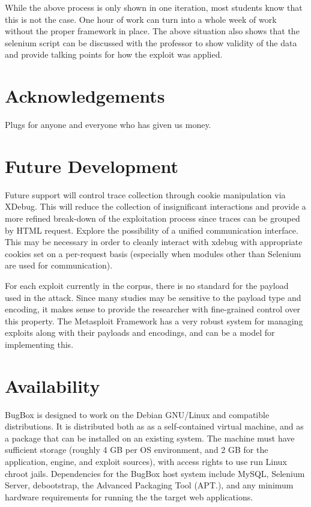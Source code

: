 \documentclass[letterpaper,twocolumn,10pt]{article}
\begin{document}
While the above process is only shown in one iteration, most students know that this is not the case.  One hour of work can turn into a whole week of work without the proper framework in place.  The above situation also shows that the selenium script can be discussed with the professor to show validity of the data and provide talking points for how the exploit was applied.


\section{Acknowledgements}

Plugs for anyone and everyone who has given us money.

\section{Future Development}
  Future support will control trace collection through cookie manipulation via XDebug. This will reduce the collection of insignificant interactions and provide a more refined break-down of the exploitation process since traces can be grouped by HTML request. Explore the possibility of a unified communication interface. This may be necessary in order to cleanly interact with xdebug with appropriate cookies set on a per-request basis (especially when modules other than Selenium are used for communication).\par
For each exploit currently in the corpus, there is no standard for the payload used in the attack. Since many studies may be sensitive to the payload type and encoding, it makes sense to provide the researcher with fine-grained control over this property. The Metasploit Framework has a very robust system for managing exploits along with their payloads and encodings, and can be a model for implementing this.

\section{Availability}

BugBox is designed to work on the Debian GNU/Linux and compatible distributions.  It is distributed both as as a self-contained virtual machine, and as a package that can be installed on an existing system. The machine must have sufficient storage (roughly 4 GB per OS environment, and 2 GB for the application, engine, and exploit sources), with access rights to use run Linux chroot jails.  Dependencies for the BugBox host system include MySQL, Selenium Server, debootstrap, the Advanced Packaging Tool (APT.), and any minimum hardware requirements for running the the target web applications.
\end{document}
